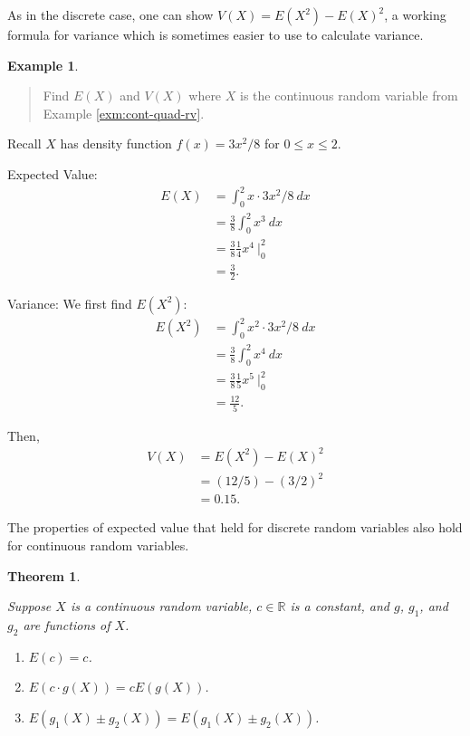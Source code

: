 \documentclass[
]{book}
\providecommand{\tightlist}{%
  \setlength{\itemsep}{0pt}\setlength{\parskip}{0pt}}
\newtheorem{theorem}{Theorem}[chapter]
\theoremstyle{definition}
\theoremstyle{definition}
\newtheorem{example}{Example}[chapter]
\theoremstyle{definition}
\theoremstyle{definition}
\theoremstyle{remark}
\begin{document}
As in the discrete case, one can show \(V(X) = E(X^2)-E(X)^2\), a working formula for variance which is sometimes easier to use to calculate variance.

\begin{example}
\leavevmode

\begin{quote}
Find \(E(X)\) and \(V(X)\) where \(X\) is the continuous random variable from Example \ref{exm:cont-quad-rv}.
\end{quote}

Recall \(X\) has density function \(\displaystyle f(x) = 3x^2/8\) for \(0 \leq x \leq 2\).

Expected Value:
\begin{align*}
E(X) &= \int_0^2 x \cdot 3x^2/8~dx \\
      &= \frac{3}{8} \int_0^2 x^3~dx \\
      &= \frac{3}{8}\frac{1}{4}x^4 ~\biggr|_0^2 \\
      &= \frac{3}{2}.
\end{align*}

Variance:
We first find \(E(X^2)\):
\begin{align*}
E(X^2) &= \int_0^2 x^2 \cdot 3x^2/8~dx \\
      &= \frac{3}{8} \int_0^2 x^4~dx \\
      &= \frac{3}{8}\frac{1}{5}x^5 ~\biggr|_0^2 \\
      &= \frac{12}{5}.
\end{align*}

Then,
\begin{align*}
V(X)    &= E(X^2) - E(X)^2 \\
        &= (12/5) - (3/2)^2\\
        &= 0.15.
\end{align*}

The properties of expected value that held for discrete random variables also hold for continuous random variables.

\begin{theorem}
\protect\hypertarget{thm:EV-properties-continuous}{}\label{thm:EV-properties-continuous}

Suppose \(X\) is a continuous random variable, \(c \in \mathbb{R}\) is a constant, and \(g\), \(g_1\), and \(g_2\) are functions of \(X\).

\begin{enumerate}
\def\labelenumi{\arabic{enumi}.}
\tightlist
\item
  \(E(c) = c\).
\item
  \(E(c\cdot g(X))= cE(g(X))\).
\item
  \(E(g_1(X) \pm g_2(X)) = E(g_1(X)\pm g_2(X))\).
\end{enumerate}


\end{theorem}
\end{example}
\end{document}

